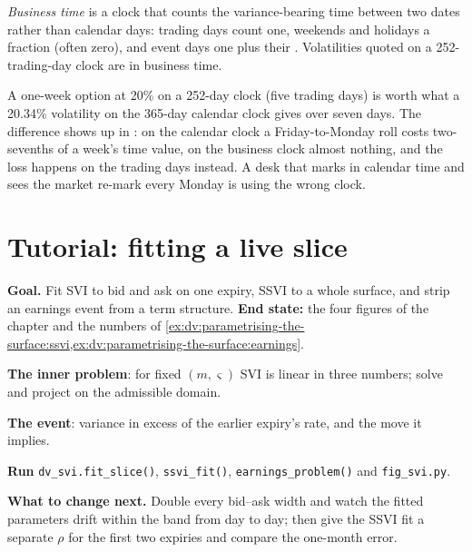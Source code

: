 \begin{definition}\label{def:dv:parametrising-the-surface:business}
\emph{Business time} is a clock that counts the variance-bearing time between
two dates rather than calendar days: trading days count one, weekends and holidays a fraction (often
zero), and event days one plus their . Volatilities quoted on a 252-trading-day clock
are in business time.
\end{definition}

A one-week option at 20\% on a 252-day clock (five trading days) is worth what a 20.34\% volatility
on the 365-day calendar clock gives over seven days. The difference shows up in : on the calendar
clock a Friday-to-Monday roll costs two-sevenths of a week's time value, on the business clock almost
nothing, and the loss happens on the trading days instead. A desk that marks in calendar time and
sees the market re-mark every Monday is using the wrong clock.

\section{Tutorial: fitting a live slice}\label{tut:dv:parametrising-the-surface:tut}

\begin{tutorial}
\textbf{Goal.} Fit SVI to bid and ask on one expiry, SSVI to a whole surface, and strip an earnings event
from a term structure. \textbf{End state:} the four figures of the chapter and the numbers of
\cref{ex:dv:parametrising-the-surface:ssvi,ex:dv:parametrising-the-surface:earnings}.
\begin{tutsteps}
\item \textbf{The inner problem}: for fixed $(m,\varsigma)$ SVI is linear in three numbers; solve and
project on the admissible domain.
\label{lst:dv:parametrising-the-surface:inner}
\item \textbf{The event}: variance in excess of the earlier expiry's rate, and the move it implies.
\label{lst:dv:parametrising-the-surface:event}
\item \textbf{Run} \texttt{dv\_svi.fit\_slice()}, \texttt{ssvi\_fit()}, \texttt{earnings\_problem()}
and \texttt{fig\_svi.py}.
\end{tutsteps}
\textbf{What to change next.} Double every bid--ask width and watch the fitted parameters drift within
the band from day to day; then give the SSVI fit a separate $\rho$ for the first two expiries and
compare the one-month error.
\end{tutorial}

